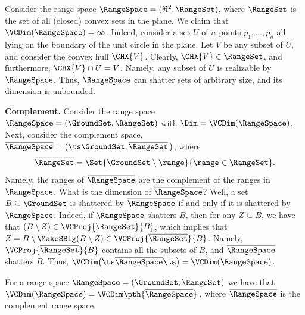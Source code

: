 

\noindent%
\begin{minipage}{0.8\linewidth}
    Consider the range space $\RangeSpace = (\Re^2, \RangeSet)$, where
    $\RangeSet$ is the set of all (closed) convex sets in the plane.
    We claim that $\VCDim(\RangeSpace)=\infty$. Indeed, consider a set
    $U$ of $n$ points $p_1,\ldots, p_n$ all lying on the boundary of
    the unit circle in the plane. Let $V$ be any subset of $U$, and
    consider the convex hull $\CHX{V}$. Clearly,
    $\CHX{V} \in \RangeSet$, and furthermore, $\CHX{V} \cap U =
    V$. Namely, any subset of $U$ is realizable by
    $\RangeSpace$. Thus, $\RangeSpace$ can shatter sets of arbitrary
    size, and its \VC dimension is unbounded.
\end{minipage}
\begin{minipage}{0.2\linewidth}
\end{minipage}

\bigskip%
\noindent%
\textbf{Complement.}  %
Consider the range space $\RangeSpace = (\GroundSet, \RangeSet)$ with
$\Dim =\VCDim(\RangeSpace)$. Next, consider the complement space,
$\overline{\RangeSpace} = \bigl(\ts\GroundSet, \overline{\RangeSet}\,
\bigr)$, where
\begin{equation*}
    \overline{\RangeSet}%
    =%
    \Set{\GroundSet \setminus \range }{ \range
       \in \RangeSet\bigr. }.
\end{equation*}
Namely, the ranges of $\overline{\RangeSpace}$ are the complement of
the ranges in $\RangeSpace$.  What is the \VC dimension of
$\overline{\RangeSpace}$?  Well, a set $B \subseteq \GroundSet$ is
shattered by $\overline{\RangeSpace}$ if and only if it is shattered
by $\RangeSpace$. Indeed, if $\RangeSpace$ shatters $B$, then for any
$Z \subseteq B$, we have that
$(B \setminus Z) \in \VCProj{\RangeSet}{B}$, which implies that
$Z = {B \setminus \MakeSBig (B \setminus Z)} \in
\VCProj{\overline{\RangeSet}}{B}$. Namely,
$\VCProj{\overline{\RangeSet}}{B}$ contains all the subsets of $B$,
and $\overline{\RangeSpace}$ shatters $B$.  Thus,
$\VCDim\bigl( \ts \overline{\RangeSpace} \ts \bigr) = \VCDim(
\RangeSpace)$.

\begin{lemma}
    For a range space $\RangeSpace = (\GroundSet, \RangeSet)$ we have
    that $\VCDim(\RangeSpace) = \VCDim
    \pth{\overline{\RangeSpace}}\,$, where $\overline{\RangeSpace}$ is
    the complement range space.    
\end{lemma}


